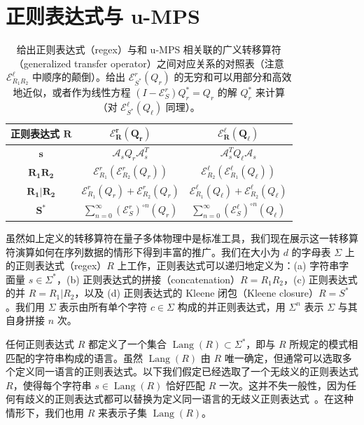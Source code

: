 \documentclass[twoside]{article}
\DeclareMathOperator{\Lang}{Lang}
\newcommand{\EL}{\mc{E}^{\scriptstyle \ell}}
\newcommand{\ER}{\mc{E}^{\scriptstyle r}}
\newcommand{\QL}{Q_{\ell}}
\newcommand{\QR}{Q_{r}}
\newcommand{\mc}[1]{\mathcal{#1}}
\begin{document}
\section{正则表达式与 u-MPS}
\label{sec:regex}
%
\begin{table}[t]
\setlength\aboverulesep{0.1pt}
\setlength\belowrulesep{0.1pt}
\renewcommand{\arraystretch}{1.7}
\caption{给出正则表达式（regex）与和 u-MPS 相关联的广义转移算符（generalized transfer operator）之间对应关系的对照表（注意 $\EL_{R_1 R_2}$ 中顺序的颠倒）。给出 $\ER_{S^*}(\QR)$ 的无穷和可以用部分和高效地近似，或者作为线性方程 $(I - \ER_S)\QR^* = \QR$ 的解 $\QR^*$ 来计算（对 $\EL_{S^*}(\QL)$ 同理）。}
\label{tab:regex_cp}
\begin{center}
\begin{small}
\begin{sc}
\begin{tabular}{c|c|c}
    \textbf{正则表达式} $\mathbf{R}$ & $\bm{\ER_R(\QR)}$ & $\bm{\EL_R(\QL)}$ \\
    \midrule
    $\mathbf{s}$ &         $\mc{A}_s \QR \mc{A}_s^T$                             & $\mc{A}_s^T \QL \mc{A}_s$ \\
    $\mathbf{R_1 R_2}$ &   $\ER_{R_1}(\ER_{R_2}(\QR))$                           & $\EL_{R_2}(\EL_{R_1}(\QL))$ \\
    $\mathbf{R_1 | R_2}$ & $\ER_{R_1}(\QR) + \ER_{R_2}(\QR)$                     & $\EL_{R_1}(\QL) + \EL_{R_2}(\QL)$ \\
    $\mathbf{S^*}$ &       $\sum_{n=0}^\infty (\ER_S)^{\circ n}(\QR)$ & $\sum_{n=0}^\infty (\EL_S)^{\circ n}(\QL)$
\end{tabular}
\end{sc}
\end{small}
\end{center}
\vskip -0.1in
\end{table}
%
虽然如上定义的转移算符在量子多体物理中是标准工具，我们现在展示这一转移算符演算如何在序列数据的情形下得到丰富的推广。我们在大小为 $d$ 的字母表 $\Sigma$ 上的正则表达式（regex）$R$ 上工作，正则表达式可以递归地定义为：(a) 字符串字面量 $s\in\Sigma^*$，(b) 正则表达式的拼接（concatenation）$R = R_1 R_2$，(c) 正则表达式的并 $R = R_1 | R_2$，以及 (d) 正则表达式的 Kleene 闭包（Kleene closure）$R = S^*$。我们用 $\Sigma$ 表示由所有单个字符 $c \in \Sigma$ 构成的并正则表达式，用 $\Sigma^n$ 表示 $\Sigma$ 与其自身拼接 $n$ 次。

任何正则表达式 $R$ 都定义了一个集合 $\Lang(R) \subset \Sigma^*$，即与 $R$ 所规定的模式相匹配的字符串构成的语言。虽然 $\Lang(R)$ 由 $R$ 唯一确定，但通常可以选取多个定义同一语言的正则表达式。以下我们假定已经选取了一个无歧义的正则表达式 $R$，使得每个字符串 $s \in \Lang(R)$ 恰好匹配 $R$ 一次。这并不失一般性，因为任何有歧义的正则表达式都可以替换为定义同一语言的无歧义正则表达式~\citep{book1971}。在这种情形下，我们也用 $R$ 来表示子集 $\Lang(R)$。
\end{document}
